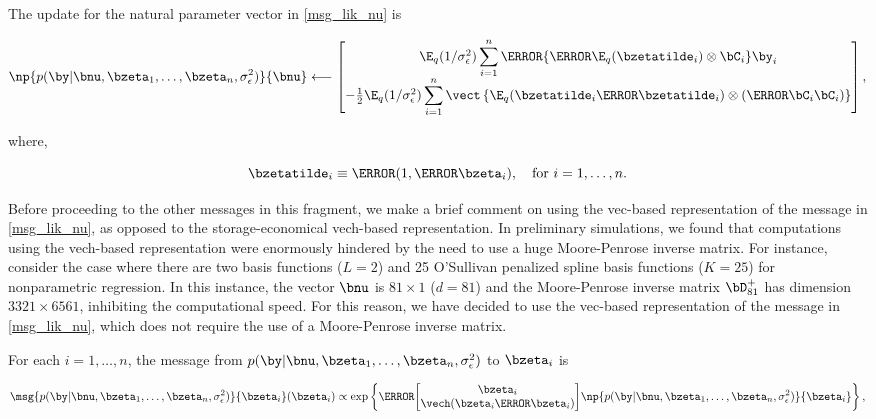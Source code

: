 \documentclass[12pt]{article}
\def\sigsqeps{\sigma^2_{\epsilon}}
\theoremstyle{plain}
\theoremstyle{definition}
\theoremstyle{remark}
\begin{document}
\noindent The update for the natural parameter vector in \eqref{msg_lik_nu} is

\begin{equation}
	\np{p (\by | \bnu, \bzeta_1, \dots, \bzeta_n, \sigsqeps)}{\bnu}
		\longleftarrow
			\begin{bmatrix}
				\E_q (1/\sigsqeps) \displaystyle\sum_{i=1}^n \T{\left\{
					\T{\E_q (\bzetatilde_i)} \otimes \bC_i
				\right\}} \by_i \\
				-\frac12 \E_q (1/\sigsqeps) \displaystyle\sum_{i=1}^n \vect \left\{
					\E_q (\bzetatilde_i \T{\bzetatilde_i}) \otimes (\T{\bC_i} \bC_i)
				\right\}
			\end{bmatrix},
\label{np_lik_nu}
\end{equation}

\noindent where, 

\begin{equation}
	\bzetatilde_i \equiv \T{(1, \T{\bzeta_i})}, \quad \text{for $i = 1, \dots, n$.}
\label{zeta_tilde}
\end{equation}

\noindent Before proceeding to the other messages in this fragment, we make a brief comment on using the vec-based
representation of the message in \eqref{msg_lik_nu}, as opposed to the storage-economical vech-based representation.
In preliminary simulations, we found that computations using the vech-based representation were enormously hindered
by the need to use a huge Moore-Penrose inverse matrix. For instance, consider the case where
there are two basis functions ($L = 2$) and 25 O'Sullivan penalized spline basis functions ($K = 25$) for nonparametric
regression. In this instance, the vector $\bnu$ is $81 \times 1$ ($d = 81$) and the Moore-Penrose inverse matrix
$\bD_{81}^+$ has dimension $3321 \times 6561$, inhibiting the computational speed. For this reason, we have
decided to use the vec-based representation of the message in \eqref{msg_lik_nu}, which does not require the
use of a Moore-Penrose inverse matrix.

For each $i = 1, \dots, n$, the message from $p (\by | \bnu, \bzeta_1, \dots, \bzeta_n, \sigsqeps)$ to $\bzeta_i$ is

\begin{equation}
	\msg{p (\by | \bnu, \bzeta_1, \dots, \bzeta_n, \sigsqeps)}{\bzeta_i} (\bzeta_i) \propto
		\exp \left\{
			\T{\begin{bmatrix}
				\bzeta_i \\
				\vech (\bzeta_i \T{\bzeta_i})
			\end{bmatrix}}
			\np{p (\by | \bnu, \bzeta_1, \dots, \bzeta_n, \sigsqeps)}{\bzeta_i}
		\right\},
\label{msg_lik_zeta}
\end{equation}
\end{document}
